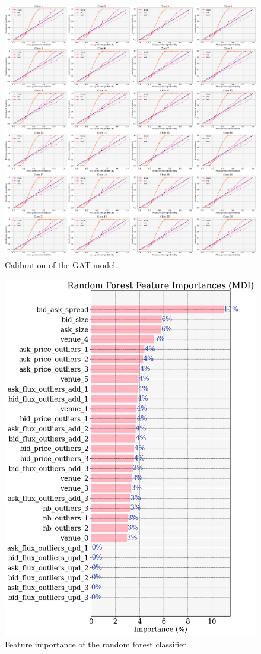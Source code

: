 \documentclass[switch, 11pt]{article}
\begin{document}
\newpage

\begin{figure}[H]
    \centering
    \includegraphics[width=\columnwidth]{figures/calibration.png}
    \caption{Calibration of the GAT model.}
    \label{fig:full_calibration}
\end{figure}

\begin{figure}[H]
    \centering
    \includegraphics[width=0.7\columnwidth]{figures/feature_importance.png}
    \caption{Feature importance of the random forest classifier.}
    \label{fig:feature_importance}
\end{figure}
\end{document}
